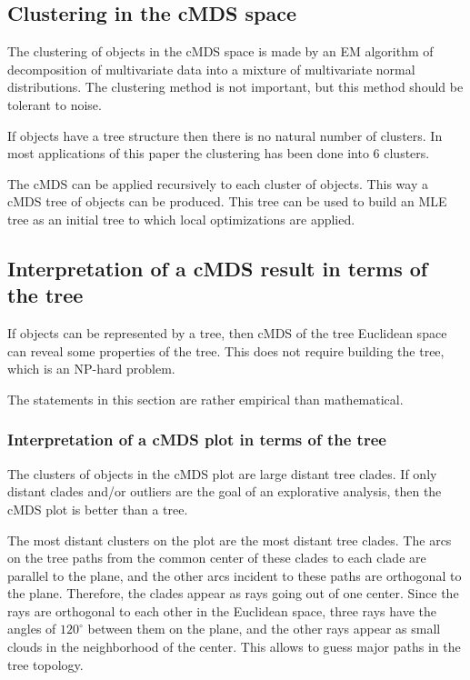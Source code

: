 \documentclass[10pt,a4paper]{article}
\begin{document}
\subsection {Clustering in the cMDS space}

The clustering of objects in the cMDS space is made by an EM algorithm of decomposition of multivariate data into a mixture of multivariate normal distributions.
The clustering method is not important, but this method should be tolerant to noise.

If objects have a tree structure then there is no natural number of clusters.
In most applications of this paper the clustering has been done into 6 clusters.

The cMDS can be applied recursively to each cluster of objects.
This way a cMDS tree of objects can be produced.
This tree can be used to build an MLE tree as an initial tree to which local optimizations are applied.


\subsection {Interpretation of a cMDS result in terms of the tree}

If objects can be represented by a tree, then cMDS of the tree Euclidean space can reveal some properties of the tree.
This does not require building the tree, which is an NP-hard problem.

The statements in this section are rather empirical than mathematical.


\subsubsection {Interpretation of a cMDS plot in terms of the tree}

The clusters of objects in the cMDS plot are large distant tree clades.
If only distant clades and/or outliers are the goal of an explorative analysis, then the cMDS plot is better than a tree.

The most distant clusters on the plot are the most distant tree clades.
The arcs on the tree paths from the common center of these clades to each clade are parallel to the plane, and the other arcs incident to these paths are orthogonal to the plane.
Therefore, the clades appear as rays going out of one center.
Since the rays are orthogonal to each other in the Euclidean space, three rays have the angles of $120^\circ$ between them on the plane, and the other rays appear as small clouds in the neighborhood of the center.
This allows to guess major paths in the tree topology.
\end{document}
